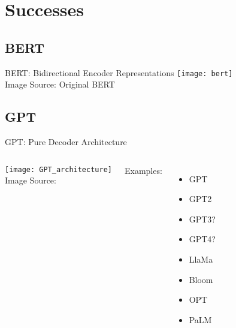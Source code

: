 \section{Successes}
\subsection{BERT}
\begin{frame}[c]{BERT: Bidirectional Encoder Representations}
    \texttt{[image: bert]} \\
    \textcolor[gray]{0.6}{
    Image Source: \cite{khalid_rubert_2021}
}
    \large
    Original BERT \cite{devlin_bert_2018}
\end{frame}

\subsection{GPT}
\begin{frame}[c]{GPT: Pure Decoder Architecture}
    \begin{columns}
        \begin{minipage}[c][\textheight][c]{\linewidth}
            \texttt{[image: GPT\_architecture]} \\
            Image Source: \cite{mody_gpt_2023}
        \end{minipage}
        \begin{minipage}[c][\textheight][c]{\linewidth}
            \large
            Examples:
            \begin{itemize}
                \item GPT \cite{radford_improving_2018}
                \item GPT2 \cite{radford_language_2019}
                \item GPT3? \cite{brown_language_2020}
                \item GPT4? \cite{openai_gpt4_2023}
                \item LlaMa \cite{touvron_llama_2023}
                \item Bloom \cite{workshop_bloom_2022}
                \item OPT \cite{zhang_opt_2022}
                \item PaLM \cite{chowdhery_palm_2022}
            \end{itemize}
        \end{minipage}
    \end{columns}
\end{frame}

